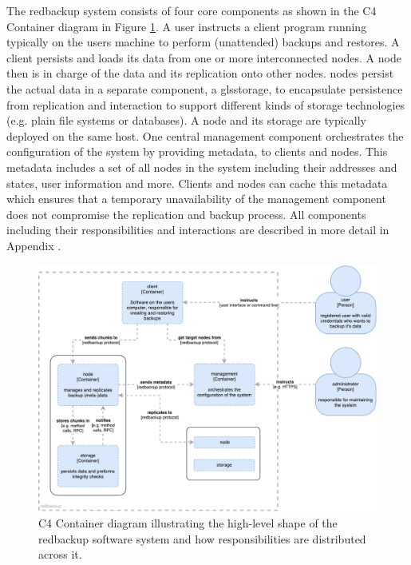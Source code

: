 The redbackup system consists of four core components as shown in the C4 Container diagram in Figure \ref{fig:c4-container}. A \gls{user} instructs a \gls{client} program running typically on the users machine to perform (unattended) backups and restores.  A client persists and loads its data from one or more interconnected \glspl{node}. A \gls{node} then is in charge of the data and its replication onto other nodes. \Glspl{node} persist the actual data in a separate component, a gls{storage}, to encapsulate persistence from replication and interaction to support different kinds of storage technologies (e.g. plain file systems or databases). A \gls{node} and its \gls{storage} are typically deployed on the same host. One central \gls{management} component orchestrates the configuration of the system by providing metadata, to clients and nodes. This metadata includes a set of all nodes in the system including their addresses and states,  user information and more. Clients and nodes can cache this metadata which ensures that a temporary unavailability of the management component does not compromise the replication and backup process. All components including their responsibilities and interactions are described in more detail in Appendix .

\begin{figure}[h]
	\centering
	\includegraphics[width=1\linewidth]{resources/c4-container}
	\caption[C4 Container diagram]{C4 Container diagram illustrating the high-level shape of the redbackup software system and how responsibilities are distributed across it.}
	\label{fig:c4-container}
\end{figure}

